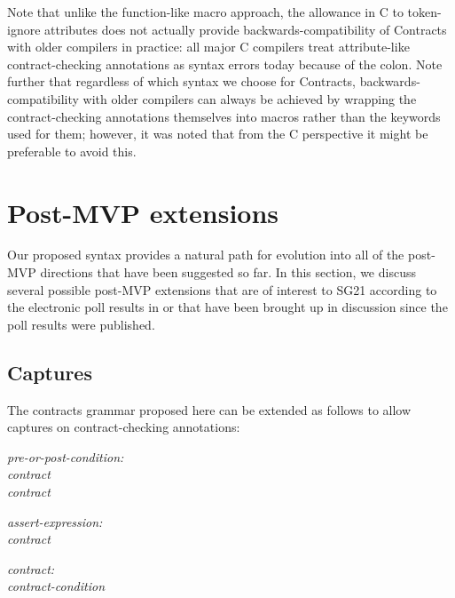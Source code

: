Note that unlike the function-like macro approach, the allowance in C to token-ignore attributes does not actually provide backwards-compatibility of Contracts with older compilers in practice: all major C compilers treat attribute-like contract-checking annotations as syntax errors today because of the colon. Note further that regardless of which syntax we choose for Contracts, backwards-compatibility with older compilers can always be achieved by wrapping the contract-checking annotations themselves into macros rather than the keywords used for them; however, it was noted that from the C perspective it might be preferable to avoid this.



\section{Post-MVP extensions}

Our proposed syntax provides a natural path for evolution into all of the post-MVP directions that have been suggested so far. In this section, we discuss several possible post-MVP extensions that are of interest to SG21 according to the electronic poll results in \cite{P2885R3} or that have been brought up in discussion since the poll results were published.

\subsection{Captures}
\label{subsec:captures}

The contracts grammar proposed here can be extended as follows to allow captures on contract-checking annotations:

\begin{adjustwidth}{0.5cm}{0.5cm}

\emph{pre-or-post-condition:} \\
\phantom{~~~} \emph{contract} \\
\phantom{~~~} \emph{contract}

\emph{assert-expression:} \\
\phantom{~~~}\emph{} \emph{contract}

\emph{contract:} \\
\phantom{~~~} \emph{contract-condition}

 \\
\phantom{~~~}

\end{adjustwidth}

